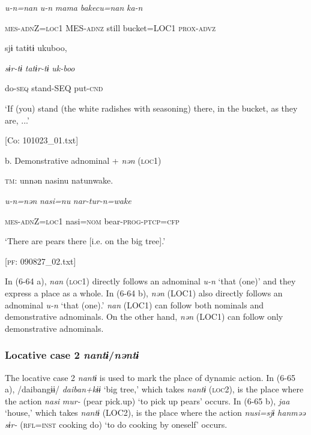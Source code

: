       \textit{u-n=nan}  \textit{u-n}  \textit{mama}  \textit{bakecu=nan}  \textit{ka-n}

      \textsc{mes}-\textsc{adn}Z=\textsc{loc}1  MES-\textsc{adnz}  still  bucket=LOC1  \textsc{prox}-\textsc{advz}

      sjɨ  tatɨtɨ  ukuboo,

      \textit{sɨr-tɨ}  \textit{tatɨr-tɨ}  \textit{uk-boo}

      do-\textsc{seq}  stand-SEQ  put-\textsc{cnd}

      ‘If (you) stand (the white radishes with seasoning) there, in the bucket, as they are, ...’

      [Co: 101023\_01.txt]

  b.  Demonstrative adnominal + \textit{nən} (\textsc{loc}1)

    \textsc{tm}:  unnən  nasinu  natunwake.

      \textit{u-n=nən}  \textit{nasi=nu}  \textit{nar-tur-n=wake}

      \textsc{mes}-\textsc{adn}Z=\textsc{loc}1  nasi=\textsc{nom}  bear-\textsc{prog}-\textsc{ptcp}=\textsc{cfp}

      ‘There are pears there [i.e. on the big tree].’

      [\textsc{pf}: 090827\_02.txt]

In (6-64 a), \textit{nan} (\textsc{loc}1) directly follows an adnominal \textit{u-n} ‘that (one)’ and they express a place as a whole. In (6-64 b), \textit{nən} (LOC1) also directly follows an adnominal \textit{u-n} ‘that (one).’ \textit{nan} (LOC1) can follow both nominals and demonstrative adnominals. On the other hand, \textit{nən} (LOC1) can follow only demonstrative adnominals.

\subsubsection{Locative case 2 \textit{nantɨ}/\textit{nəntɨ}}

The locative case 2 \textit{nantɨ} is used to mark the place of dynamic action. In (6-65 a), /daibangɨɨ/ \textit{daiban+kɨɨ} ‘big tree,’ which takes \textit{nantɨ} (\textsc{loc}2), is the place where the action \textit{nasi} \textit{mur-} (pear pick.up) ‘to pick up pears’ occurs. In (6-65 b), \textit{jaa} ‘house,’ which takes \textit{nantɨ} (LOC2), is the place where the action \textit{nusi=sjɨ} \textit{hanməə} \textit{sɨr-} (\textsc{rfl}=\textsc{inst} cooking do) ‘to do cooking by oneself’ occurs.

